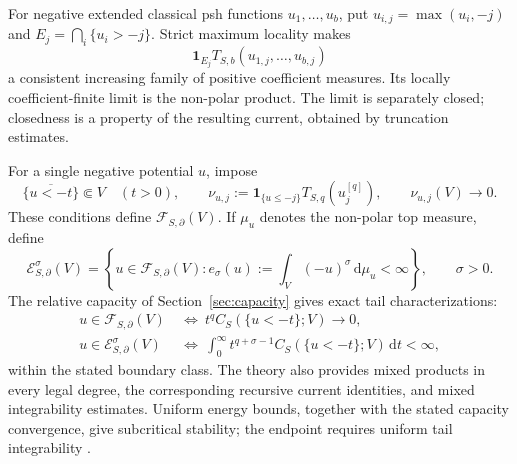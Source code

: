\documentclass[11pt,a4paper]{article}
\newcommand{\MathSecref}[1]{{\hypersetup{linkcolor=SectionLink}Section~\ref{#1}}}
\theoremstyle{definition}
\theoremstyle{remark}
\numberwithin{equation}{section}
\newcommand{\dd}{\mathrm d}
\newcommand{\one}{\mathbf 1}
\begin{document}
For negative extended classical psh functions $u_1,\ldots,u_b$, put
$u_{i,j}=\max(u_i,-j)$ and $E_j=\bigcap_i\{u_i>-j\}$.  Strict maximum
locality makes
\begin{equation}
 \one_{E_j}T_{S,b}(u_{1,j},\ldots,u_{b,j})
                         \label{eq:nonpolar-truncation}
\end{equation}
a consistent increasing family of positive coefficient measures.
Its locally coefficient-finite limit is the non-polar product.  The
limit is separately closed; closedness is a property of the resulting
current, obtained by truncation estimates.

For a single negative potential $u$, impose
\begin{equation}
 \overline{\{u<-t\}}\Subset V\quad(t>0),
 \qquad
 \nu_{u,j}:=\one_{\{u\le-j\}}T_{S,q}(u_j^{[q]}),
 \qquad \nu_{u,j}(V)\longrightarrow0.
                         \label{eq:no-loss}
\end{equation}
These conditions define $\mathcal F_{S,\partial}(V)$.  If $\mu_u$
denotes the non-polar top measure, define
\begin{equation}
 \mathcal E^\sigma_{S,\partial}(V)
   =\left\{u\in\mathcal F_{S,\partial}(V):
                e_\sigma(u):=\int_V(-u)^\sigma\,\dd\mu_u<\infty\right\},
                  \qquad \sigma>0.
                         \label{eq:energy-class}
\end{equation}
The relative capacity of \MathSecref{sec:capacity} gives exact tail
characterizations:
\begin{align}
 u\in\mathcal F_{S,\partial}(V)
   &\ \Longleftrightarrow\
       t^q C_S(\{u<-t\};V)\longrightarrow0,
                        \label{eq:no-loss-capacity}\\
 u\in\mathcal E^\sigma_{S,\partial}(V)
   &\ \Longleftrightarrow\
       \int_0^\infty t^{q+\sigma-1}
                    C_S(\{u<-t\};V)\,\dd t<\infty,
                        \label{eq:energy-capacity}
\end{align}
within the stated boundary class.  The theory also provides mixed
products in every legal degree, the corresponding recursive current
identities, and mixed integrability estimates.  Uniform energy bounds,
together with the stated capacity convergence, give subcritical
stability; the endpoint requires uniform tail
integrability \cite{Rchain}.
\end{document}

